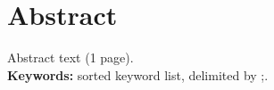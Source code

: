 \cleardoublepage\newpage
\chapter*{Abstract} \label{abstract}
Abstract text (1 page).\\

{\bf Keywords:} sorted keyword list, delimited by ;.